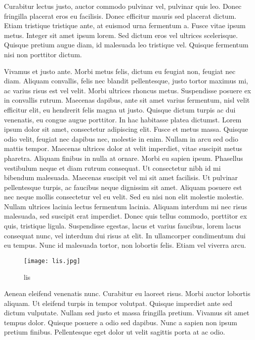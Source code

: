 \documentclass[12pt,a4paper]{article}
\begin{document}
Curabitur lectus justo, auctor commodo pulvinar vel, pulvinar quis leo. Donec fringilla placerat eros eu facilisis. Donec efficitur mauris sed placerat dictum. Etiam tristique tristique ante, at euismod urna fermentum a. Fusce vitae ipsum metus. Integer sit amet ipsum lorem. Sed dictum eros vel ultrices scelerisque. Quisque pretium augue diam, id malesuada leo tristique vel. Quisque fermentum nisi non porttitor dictum.

Vivamus et justo ante. Morbi metus felis, dictum eu feugiat non, feugiat nec diam. Aliquam convallis, felis nec blandit pellentesque, justo tortor maximus mi, ac varius risus est vel velit. Morbi ultrices rhoncus metus. Suspendisse posuere ex in convallis rutrum. Maecenas dapibus, ante sit amet varius fermentum, nisl velit efficitur elit, eu hendrerit felis magna ut justo. Quisque dictum turpis ac dui venenatis, eu congue augue porttitor. In hac habitasse platea dictumst. Lorem ipsum dolor sit amet, consectetur adipiscing elit. Fusce et metus massa. Quisque odio velit, feugiat nec dapibus nec, molestie in enim. Nullam in arcu sed odio mattis tempor. Maecenas ultrices dolor at velit imperdiet, vitae suscipit metus pharetra. Aliquam finibus in nulla at ornare.
Morbi eu sapien ipsum. Phasellus vestibulum neque et diam rutrum consequat. Ut consectetur nibh id mi bibendum malesuada. Maecenas suscipit vel mi sit amet facilisis. Ut pulvinar pellentesque turpis, ac faucibus neque dignissim sit amet. Aliquam posuere est nec neque mollis consectetur vel eu velit. Sed eu nisi non elit molestie molestie. Nullam ultrices lacinia lectus fermentum lacinia. Aliquam interdum mi nec risus malesuada, sed suscipit erat imperdiet. Donec quis tellus commodo, porttitor ex quis, tristique ligula. Suspendisse egestas, lacus et varius faucibus, lorem lacus consequat nunc, vel interdum dui risus at elit. In ullamcorper condimentum dui eu tempus. Nunc id malesuada tortor, non lobortis felis. Etiam vel viverra arcu.
	\begin{figure}[H]
		\centering
		\texttt{[image: lis.jpg]}
		\caption{lis}
	\end{figure}
 \label{lis}
Aenean eleifend venenatis nunc. Curabitur eu laoreet risus. Morbi auctor lobortis aliquam. Ut eleifend turpis in tempor volutpat. Quisque imperdiet ante sed dictum vulputate. Nullam sed justo et massa fringilla pretium. Vivamus sit amet tempus dolor. Quisque posuere a odio sed dapibus. Nunc a sapien non ipsum pretium finibus. Pellentesque eget dolor ut velit sagittis porta at ac odio.
\end{document}
